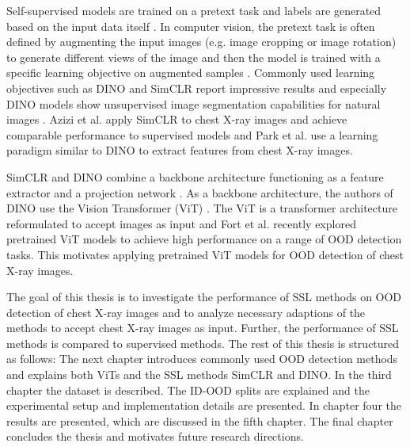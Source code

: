 Self-supervised models are trained on a pretext task and labels are generated based on the input data itself \citep{Jaiswal2021}.
In computer vision, the pretext task is often defined by augmenting the input images (e.g. image cropping or image rotation) to generate different views of the image and then the model is trained with a specific learning objective on augmented samples \citep{Jaiswal2020}.
Commonly used learning objectives such as DINO \citep{Caron2021} and SimCLR \citep{Chen2020} report impressive results and especially DINO models show unsupervised image segmentation capabilities for natural images \citep{Caron2021}.
Azizi et al. \citep{Azizi2021} apply SimCLR to chest X-ray images and achieve comparable performance to supervised models and Park et al. \citep{Park2022} use a learning paradigm similar to DINO to extract features from chest X-ray images.
\par
SimCLR and DINO combine a backbone architecture functioning as a feature extractor and a projection network \citep{Caron2021,Chen2020}. 
As a backbone architecture, the authors of DINO use the Vision Transformer (ViT) \citep{Caron2021}.
The ViT is a transformer architecture \citep{Vaswani2017} reformulated to accept images as input \citep{Dosovitskiy2020} and Fort et al. \citep{Fort2021} recently explored pretrained ViT models to achieve high performance on a range of OOD detection tasks.
This motivates applying pretrained ViT models for OOD detection of chest X-ray images.
\par
The goal of this thesis is to investigate the performance of SSL methods on OOD detection of chest X-ray images and to analyze necessary adaptions of the methods to accept chest X-ray images as input.
Further, the performance of SSL methods is compared to supervised methods.
The rest of this thesis is structured as follows: The next chapter introduces commonly used OOD detection methods and explains both ViTs and the SSL methods SimCLR and DINO.
In the third chapter the dataset is described.
The ID-OOD splits are explained and the experimental setup and implementation details are presented.
In chapter four the results are presented, which are discussed in the fifth chapter.
The final chapter concludes the thesis and motivates future research directions.
